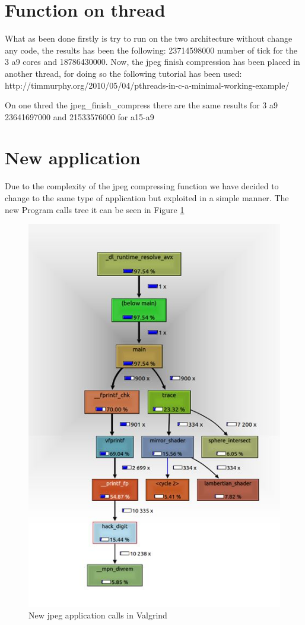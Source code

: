 \documentclass[journal]{IEEEtran}
\begin{document}
\section{Function on thread}

What as been done firstly is try to run on the two architecture without change any code, the results has been the following:
23714598000 number of tick for the 3 a9 cores and 18786430000. 
Now, the jpeg finish compression has been placed in another thread, for doing so the following tutorial has been used: http://timmurphy.org/2010/05/04/pthreads-in-c-a-minimal-working-example/

On one thred the jpeg\_finish\_compress there are the same results for 3 a9 23641697000 and 21533576000 for a15-a9



\section{New application}
Due to the complexity of the jpeg compressing function we have decided to change to the same type of application but exploited in a simple manner. The new Program calls tree it can be seen in Figure \ref{fig:valgrind2}

\begin{figure}[!h]
	\centering
	\includegraphics[width=.8\linewidth]{valgrind2}
	\caption{New jpeg application calls in Valgrind}
	\label{fig:valgrind2}
\end{figure}
\end{document}
